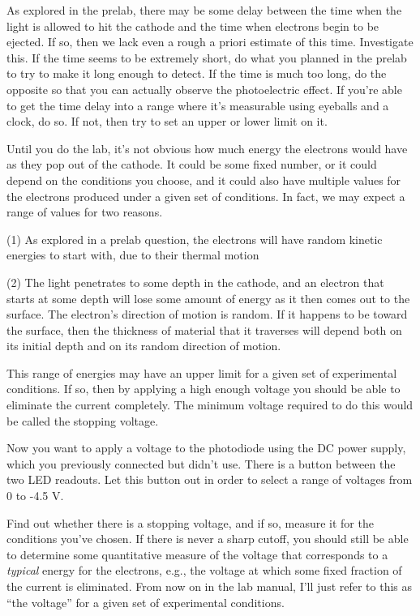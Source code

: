 
As explored in the prelab, there may be some
delay between the time when the light
is allowed to hit the cathode and the time when electrons begin to be ejected.
If so, then we lack even a rough a priori estimate of this time.
Investigate this. If the time seems to be extremely short, do what you planned in the
prelab to try to make it long enough to detect. If the time is much too long, do the
opposite so that you can actually observe the photoelectric effect. If you're able to get the time
delay into a range where it's measurable using eyeballs and a clock, do so. If not,
then try to set an upper or lower limit on it.


Until you do the lab, it's not obvious how much energy the electrons would have
as they pop out of the cathode. It could be some fixed number, or it could depend on the
conditions you choose, and it could also have multiple values for the electrons produced
under a given set of conditions. In fact, we may expect a range of values for two reasons.

(1) As explored in a prelab question, the electrons will have random kinetic energies to start
with, due to their thermal motion

(2) The light penetrates to some depth in the cathode,
and an electron that starts at some depth will lose some amount of energy as it then comes out
to the surface. The electron's direction of motion is random. If it happens to be toward the
surface, then the thickness of material that it traverses will depend both on its initial
depth and on its random direction of motion.

This range of energies may have an upper limit for a given set of experimental conditions.
If so, then by applying a high enough voltage you should be able to eliminate the current
completely. The minimum voltage required to do this would be called the stopping voltage.

Now you want to apply a voltage to the photodiode using the DC power supply, which you previously
connected but didn't use.
There is a button between the
two LED readouts. Let this button out in order to select a range of voltages from 0 to -4.5 V.

Find out whether there is a stopping voltage, and if so, measure it for the conditions you've chosen.
If there is never a sharp cutoff, you should still be able to determine some quantitative measure
of the voltage that corresponds to a \emph{typical} energy for the electrons, e.g., the voltage at
which some fixed fraction of the current is eliminated. From now on in the lab manual, I'll
just refer to this as ``the voltage'' for a given set of experimental conditions.

